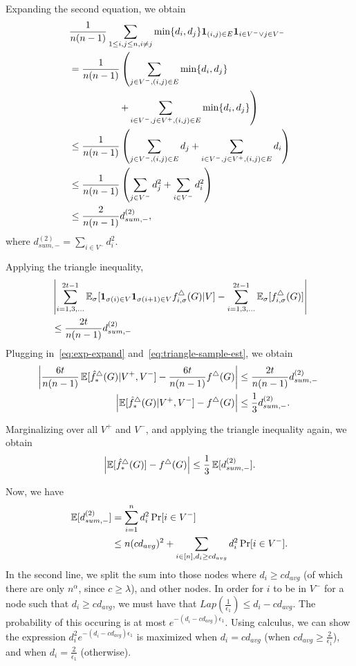 Expanding the second equation, we obtain
\begin{align*}
  &\frac{1}{n(n-1)} \sum_{1\leq i,j \leq n, i \neq j}
  \min\{d_i, d_j\}\textbf{1}_{(i,j) \in E}\textbf{1}_{i \in V^-
  \vee j \in V^-} \\
  &= \frac{1}{n(n-1)}\left( \sum_{j \in V^-, (i,j) \in E} \min\{d_i, d_j\} \right. \\
  &\hspace{18mm} \left. +
  \sum_{i \in V^-, j \in V^+, (i,j) \in E} \min\{d_i, d_j\}\right) \\
  &\leq \frac{1}{n(n-1)}\left( \sum_{j \in V^-, (i,j) \in E} d_j +
  \sum_{i \in V^-, j \in V^+, (i,j) \in E} d_i\right) \\
  &\leq \frac{1}{n(n-1)}\left( \sum_{j \in V^-} d_j^2 +
  \sum_{i \in V^-} d_i^2 \right) \\
  &\leq \frac{2}{n(n-1)}d_{sum,-}^{(2)},
\end{align*}
where $d_{sum,-}^{(2)} = \sum_{i \in V^-} d_i^2$.

Applying the triangle inequality,
\begin{align*}
  &\left|\sum_{i=1,3,\ldots}^{2t-1}\operatorname{\mathbb{E}}_\sigma [\textbf{1}_{\sigma(i)\in V}\textbf{1}_{\sigma(i+1) \in V}
  f_{i,\sigma}^\triangle(G) | V] -
  \sum_{i=1,3,\ldots}^{2t-1}\operatorname{\mathbb{E}}_\sigma[f_{i,\sigma}^\triangle(G) ]\right| \\
  &\leq
  \frac{2t}{n(n-1)} d_{sum,-}^{(2)}
\end{align*}
Plugging in~\eqref{eq:exp-expand} and~\eqref{eq:triangle-sample-est}, we obtain
\begin{align}
  \hspace{-1mm}\left|\frac{6t}{n(n-1)}\operatorname{\mathbb{E}}[\hat{f}^\triangle_*(G)|V^+,V^-] -
  \frac{6t}{n(n-1)}f^\triangle(G)\right| &\leq
  \frac{2t}{n(n-1)} d_{sum,-}^{(2)} \nonumber \\
  \hspace{-1mm}\left|\operatorname{\mathbb{E}}[\hat{f}^\triangle_*(G)|V^+,V^-] -
  f^\triangle(G)\right| &\leq \frac{1}{3} d_{sum,-}^{(2)}.\label{eq:bias-vv}
\end{align}

Marginalizing over all $V^+$ and $V^-$, and applying the triangle inequality again, we obtain
\[
  \left|\operatorname{\mathbb{E}}[\hat{f}^\triangle_*(G)] -
  f^\triangle(G)\right| \leq
  \frac{1}{3} \operatorname{\mathbb{E}}[d_{sum,-}^{(2)}].
\]

Now, we have
\begin{align*}
  \operatorname{\mathbb{E}}[d_{sum,-}^{(2)}] &= \sum_{i = 1}^n d_i^2 \Pr[i \in V^-] \\
  &\leq n(c d_{avg})^2 + \sum_{i \in [n], d_i \geq c d_{avg}} d_i^2 \Pr[i \in
  V^-].
\end{align*}
In the second line, we split the sum into those nodes where $d_i \geq c d_{avg}$
(of which there are only $n^\alpha$, since $c \geq \lambda$), and other nodes.
In order for $i$ to be in $V^-$ for a node such that $d_i \geq c d_{avg}$, we
must have that $Lap(\frac{1}{\epsilon_1}) \leq d_i - c d_{avg}$. The probability
of this occuring is at most $e^{-(d_i - c d_{avg})\epsilon_1}$. Using calculus, we
can show the expression $d_i^2 e^{-(d_i - c d_{avg})\epsilon_1}$ is maximized when 
$d_i = c d_{avg}$ (when 
$c d_{avg} \geq \frac{2}{\epsilon_1}$), and when $d_i = \frac{2}{\epsilon_1}$
(otherwise).

